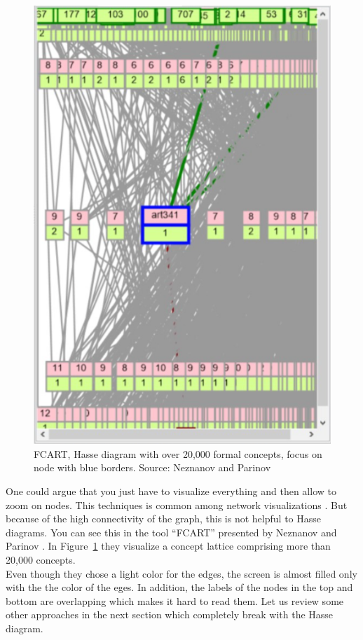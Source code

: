 \documentclass[11pt]{report}
\begin{document}
\begin{figure}[!ht]
	\centering
	\includegraphics[width=0.5\linewidth]{./images/fcart}
\caption{FCART, Hasse diagram with over 20,000 formal concepts, focus on node with blue borders. Source: Neznanov and Parinov \cite{Neznanov2014}}
\label{figure:fcart}
\end{figure}

One could argue that you just have to visualize everything and then allow to zoom on nodes. This techniques is common among network visualizations \cite{Herman2000}. But because of the high connectivity of the graph, this is not helpful to Hasse diagrams. You can see this in the tool ``FCART'' presented by Neznanov and Parinov \cite{Neznanov2014}. In Figure~\ref{figure:fcart} they visualize a concept lattice comprising more than 20,000 concepts. \\

Even though they chose a light color for the edges, the screen is almost filled only with the the color of the eges. In addition, the labels of the nodes in the top and bottom are overlapping which makes it hard to read them. Let us review some other approaches in the next section which completely break with the Hasse diagram. \\
\end{document}
